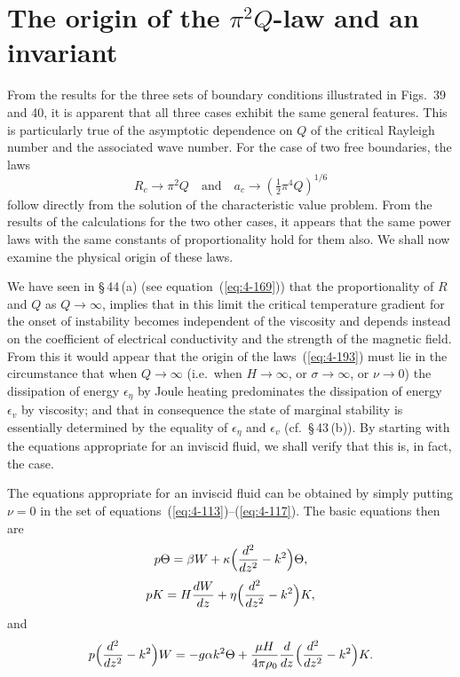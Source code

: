 \section{The origin of the $\pi^2Q$-law and an invariant}\label{sec:45}

From the results for the three sets of boundary conditions illustrated in Figs.~39 and 40, it is apparent that all three cases exhibit the same general features. This is particularly true of the asymptotic dependence on $Q$ of the critical Rayleigh number and the associated wave number. For the case of two free boundaries, the laws
\begin{equation}
\label{eq:4-193}
R_c \to \pi^2 Q \quad\text{and}\quad a_c \to (\tfrac{1}{2}\pi^4 Q)^{1/6}
\end{equation}
follow directly from the solution of the characteristic value problem. From the results of the calculations for the two other cases, it appears that the same power laws with the same constants of proportionality hold for them also. We shall now examine the physical origin of these laws.

We have seen in \S\,44\,(a) (see equation~(\ref{eq:4-169})) that the proportionality of $R$ and $Q$ as $Q\to\infty$, implies that in this limit the critical temperature gradient for the onset of instability becomes independent of the viscosity and depends instead on the coefficient of electrical conductivity and the strength of the magnetic field. From this it would appear that the origin of the laws~(\ref{eq:4-193}) must lie in the circumstance that when $Q\to\infty$ (i.e.\ when $H\to\infty$, or $\sigma\to\infty$, or $\nu\to 0$) the dissipation of energy $\epsilon_\eta$ by Joule heating predominates the dissipation of energy $\epsilon_v$ by viscosity; and that in consequence the state of marginal stability is essentially determined by the equality of $\epsilon_\eta$ and $\epsilon_v$ (cf.\ \S\,43\,(b)). By starting with the equations appropriate for an inviscid fluid, we shall verify that this is, in fact, the case.

The equations appropriate for an inviscid fluid can be obtained by simply putting $\nu=0$ in the set of equations~(\ref{eq:4-113})--(\ref{eq:4-117}). The basic equations then are
\begin{equation}
\label{eq:4-194}
p\Theta = \beta W + \kappa\Bigl(\frac{d^2}{dz^2}-k^2\Bigr)\Theta,
\end{equation}
\begin{equation}
\label{eq:4-195}
pK = H\frac{dW}{dz}+\eta\Bigl(\frac{d^2}{dz^2}-k^2\Bigr)K,
\end{equation}
and
\begin{equation}
\label{eq:4-196}
p\Bigl(\frac{d^2}{dz^2}-k^2\Bigr)W = -g\alpha k^2\Theta + \frac{\mu H}{4\pi\rho_0}\frac{d}{dz}\Bigl(\frac{d^2}{dz^2}-k^2\Bigr)K.
\end{equation}

